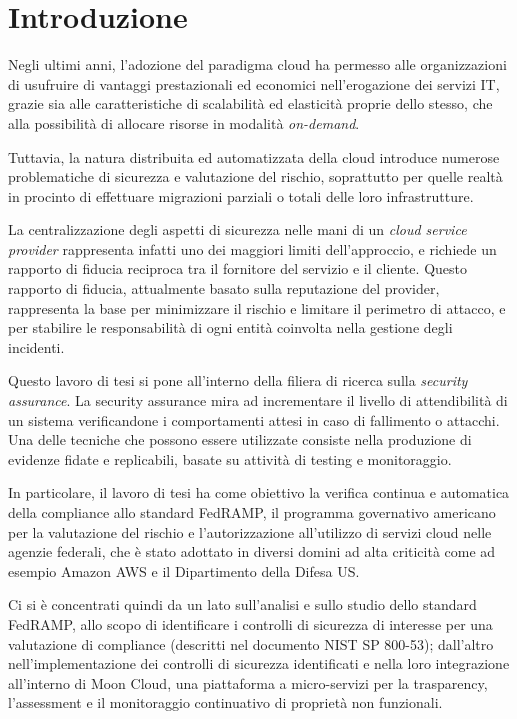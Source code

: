 \documentclass[../main.tex]{subfiles}
\begin{document}
\chapter*{Introduzione}

Negli ultimi anni, l'adozione del paradigma cloud ha permesso alle organizzazioni di usufruire di vantaggi prestazionali ed economici nell'erogazione dei servizi IT, grazie sia alle caratteristiche di scalabilità ed elasticità proprie dello stesso, che alla possibilità di allocare risorse in modalità \textit{on-demand}.


Tuttavia, la natura distribuita ed automatizzata della cloud introduce numerose problematiche di sicurezza e valutazione del rischio, soprattutto per quelle realtà in procinto di effettuare migrazioni parziali o totali delle loro infrastrutture.

La centralizzazione degli aspetti di sicurezza nelle mani di un \textit{cloud service provider} rappresenta infatti uno dei maggiori limiti dell'approccio, e richiede un rapporto di fiducia reciproca tra il fornitore del servizio e il cliente. Questo rapporto di fiducia, attualmente basato sulla reputazione del provider, rappresenta la base per minimizzare il rischio e limitare il perimetro di attacco, e per stabilire le responsabilità di ogni entità coinvolta nella gestione degli incidenti.


Questo lavoro di tesi si pone all'interno della filiera di ricerca sulla \textit{security assurance}.
La security assurance mira ad incrementare il livello di attendibilità di un sistema verificandone i comportamenti attesi in caso di fallimento o attacchi.
Una delle tecniche che possono essere utilizzate consiste nella produzione di evidenze fidate e replicabili, basate su attività di testing e monitoraggio.


In particolare, il lavoro di tesi ha come obiettivo la verifica continua e automatica della compliance allo standard FedRAMP, il programma governativo americano per la valutazione del rischio e l'autorizzazione all'utilizzo di servizi cloud nelle agenzie federali, che è stato adottato in diversi domini ad alta criticità come ad esempio Amazon AWS e il Dipartimento della Difesa US.

Ci si è concentrati quindi da un lato sull'analisi e sullo studio dello standard FedRAMP, allo scopo di identificare i controlli di sicurezza di interesse per una valutazione di compliance (descritti nel documento NIST SP 800-53); dall'altro nell'implementazione dei controlli di sicurezza identificati e nella loro integrazione all'interno di Moon Cloud, una piattaforma a micro-servizi per la trasparency, l'assessment e il monitoraggio continuativo di proprietà non funzionali.
\end{document}
